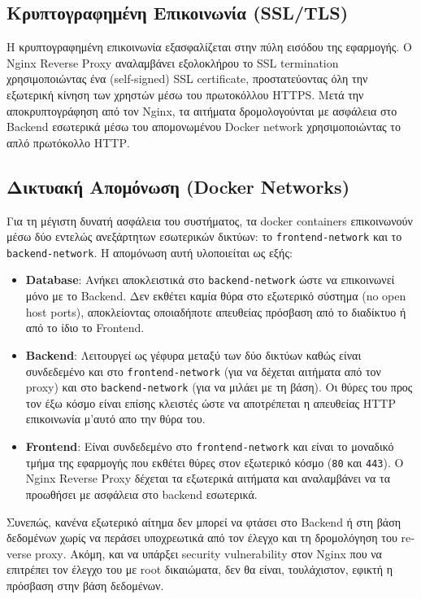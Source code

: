 \documentclass[12pt]{fphw}
\newcommand{\en}[1]{\foreignlanguage{english}{#1}}
\begin{document}
\subsection{Κρυπτογραφημένη Επικοινωνία (SSL/TLS)}
Η κρυπτογραφημένη επικοινωνία εξασφαλίζεται στην πύλη εισόδου της εφαρμογής. Ο \en{Nginx Reverse Proxy} αναλαμβάνει εξολοκλήρου το \en{SSL termination} χρησιμοποιώντας ένα (\en{self-signed}) \en{SSL certificate}, προστατεύοντας όλη την εξωτερική κίνηση των χρηστών μέσω του πρωτοκόλλου \en{HTTPS}. Μετά την αποκρυπτογράφηση από τον \en{Nginx}, τα αιτήματα δρομολογούνται με ασφάλεια στο \en{Backend} εσωτερικά μέσω του απομονωμένου \en{Docker network} χρησιμοποιώντας το απλό πρωτόκολλο \en{HTTP}.

\subsection{Δικτυακή Απομόνωση (\en{Docker Networks})}
Για τη μέγιστη δυνατή ασφάλεια του συστήματος, τα \en{docker containers} επικοινωνούν μέσω δύο εντελώς ανεξάρτητων εσωτερικών δικτύων: το \en{\texttt{frontend-network}} και το \en{\texttt{backend-network}}. Η απομόνωση αυτή υλοποιείται ως εξής:
\begin{itemize}[leftmargin=*]
    \item \en{\textbf{Database}}: Ανήκει αποκλειστικά στο \en{\texttt{backend-network}} ώστε να επικοινωνεί μόνο με το \en{Backend}. Δεν εκθέτει καμία θύρα στο εξωτερικό σύστημα (\en{no open host ports}), αποκλείοντας οποιαδήποτε απευθείας πρόσβαση από το διαδίκτυο ή από το ίδιο το \en{Frontend}.
    \item \en{\textbf{Backend}}: Λειτουργεί ως γέφυρα μεταξύ των δύο δικτύων καθώς είναι συνδεδεμένο και στο \en{\texttt{frontend-network}} (για να δέχεται αιτήματα από τον \en{proxy}) και στο \en{\texttt{backend-network}} (για να μιλάει με τη βάση). Οι θύρες του προς τον έξω κόσμο είναι επίσης κλειστές ώστε να αποτρέπεται η απευθείας HTTP επικοινωνία μ'αυτό απο την θύρα του.
    \item \en{\textbf{Frontend}}: Είναι συνδεδεμένο στο \texttt{frontend-network} και είναι το μοναδικό τμήμα της εφαρμογής που εκθέτει θύρες στον εξωτερικό κόσμο (\en{\texttt{80}} και \en{\texttt{443}}). Ο \en{Nginx Reverse Proxy} δέχεται τα εξωτερικά αιτήματα και αναλαμβάνει να τα προωθήσει με ασφάλεια στο \en{backend} εσωτερικά.
\end{itemize}
Συνεπώς, κανένα εξωτερικό αίτημα δεν μπορεί να φτάσει στο \en{Backend} ή στη βάση δεδομένων χωρίς να περάσει υποχρεωτικά από τον έλεγχο και τη δρομολόγηση του \en{reverse proxy}. Ακόμη, και να υπάρξει security vulnerability στον Nginx που να επιτρέπει τον έλεγχο του με root δικαιώματα, δεν θα είναι, τουλάχιστον, εφικτή η πρόσβαση στην βάση δεδομένων.
\end{document}
